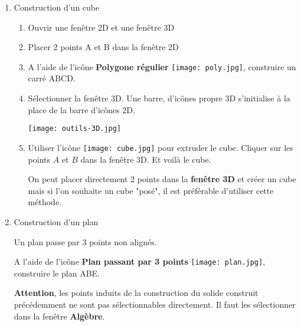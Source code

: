 \begin{enumerate}
\item Construction d'un cube  

\begin{enumerate}
\item Ouvrir une fenêtre 2D et une fenêtre 3D
\item Placer 2 points A et B dans la fenêtre 2D 
\item A l'aide de l'icône \textbf{Polygone régulier} \texttt{[image: poly.jpg]}, construire un carré ABCD.
\item Sélectionner la fenêtre 3D. Une barre, d'icônes propre 3D s'initialise à la place de la barre d'icônes 2D. 

\texttt{[image: outils-3D.jpg]} 

\item Utiliser l'icône \texttt{[image: cube.jpg]} pour extruder le cube. Cliquer sur les points $A$ et $B$ dans la fenêtre 3D. Et voilà le cube.

On peut placer directement 2 points dans la \textbf{fenêtre 3D }et créer un cube mais si l'on souhaite un cube "posé", il est préférable d'utiliser cette méthode.

\end{enumerate}

\item  Construction d'un plan  

Un plan passe par 3 points non alignés.

 A l'aide de l'icône \textbf{Plan passant par 3 points} \texttt{[image: plan.jpg]}, construire le plan ABE.
 
\textbf{Attention}, les points induits de la construction du solide construit précédemment ne sont pas sélectionnables \mbox{directement}. Il faut les sélectionner dans la fenêtre \textbf{Algèbre}.

\end{enumerate}



